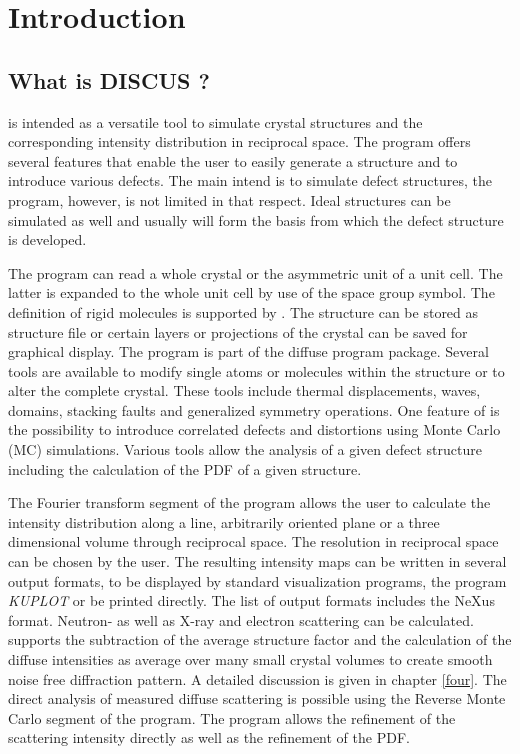 
\chapter{Introduction}
\section{What is DISCUS ?}

\Discus \citep{prne97} is intended as a versatile tool to
simulate crystal structures and the corresponding intensity
distribution in reciprocal space.  The program offers several
features that enable the user to easily generate a structure and
to introduce various defects.  The main intend is to simulate
defect structures, the program, however, is not limited in that
respect.  Ideal structures can be simulated as well and usually
will form the basis from which the defect structure is developed.
\par

The program can read a whole crystal or the asymmetric unit of a
unit cell. The latter is expanded to the whole unit cell by use of
the space group symbol. The definition of rigid molecules is
supported by \discus. The structure can be stored as structure
file or certain layers or projections of the crystal can be saved
for graphical display. The program \Discus is part of the
diffuse program package. Several tools are available to
modify single atoms or molecules within the structure or to alter
the complete crystal. These tools include thermal displacements,
waves, domains, stacking faults and generalized symmetry
operations. One feature of \Discus is the possibility to
introduce correlated defects and distortions using Monte Carlo (MC)
simulations. Various tools allow the analysis of a given defect
structure including the calculation of the PDF of a given structure.
\par

The Fourier transform segment of the program allows the user to
calculate  the intensity distribution along a line, arbitrarily 
oriented plane or a three dimensional volume
through reciprocal space. The resolution in reciprocal space can be
chosen by the user. The resulting intensity maps can be written in
several output formats, to be displayed by standard visualization
programs, the program {\it KUPLOT} or be printed directly.
The list of output formats includes the NeXus format.  Neutron-
as well as X-ray and electron scattering can be calculated. 
\Discus supports
the subtraction of the average structure factor and the calculation
of the diffuse intensities as average over many small crystal
volumes to create smooth noise free diffraction pattern. A detailed
discussion is given in chapter \ref{four}. The direct analysis of
measured diffuse scattering is possible using the Reverse Monte
Carlo segment of the program. The program allows the refinement of
the scattering intensity directly as well as the refinement of the
PDF. \par

